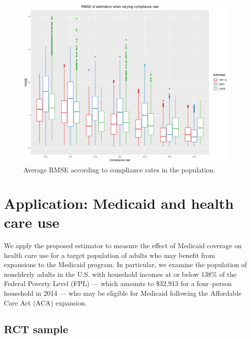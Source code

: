 \documentclass[hidelinks,12pt]{article}
\begin{document}
\begin{figure}[htbp]
\begin{center}
\includegraphics[width = 1\textwidth]{rmse_boxplots_rateC.png}
\caption{Average RMSE according to compliance rates in the population.\label{fig:rmse_boxplots_rateC}}
\end{center}
\end{figure}

\pagebreak
\section{Application: Medicaid and health care use} \label{application}

We apply the proposed estimator to measure the effect of Medicaid coverage on health care use for a target population of adults who may benefit from expansions to the Medicaid program. In particular, we examine the population of nonelderly adults in the U.S. with household incomes at or below 138\% of the Federal Poverty Level (FPL) --- which amounts to \$32,913 for a four--person household in 2014 --- who may be eligible for Medicaid following the Affordable Care Act (ACA) expansion.

\subsection{RCT sample} 
\end{document}
